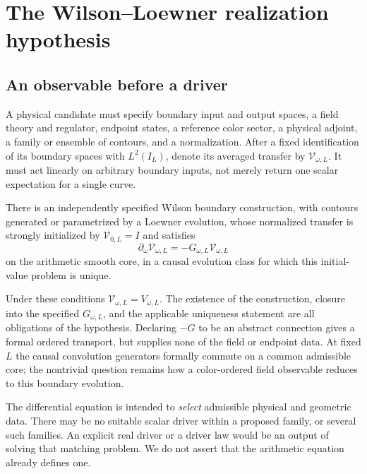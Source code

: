 \section{The Wilson--Loewner realization hypothesis}\label{sec:realization}

\subsection{An observable before a driver}

A physical candidate must specify boundary input and output spaces,
a field theory and regulator, endpoint states, a reference color
sector, a physical adjoint, a family or ensemble of contours, and a
normalization. After a fixed identification of its boundary spaces
with $L^2(I_L)$, denote its averaged transfer by
$\mathcal V_{\omega,L}$. It must act linearly on arbitrary boundary
inputs, not merely return one scalar expectation for a single curve.

\begin{hypothesis}\label{hyp:realization}
There is an independently specified Wilson boundary construction,
with contours generated or parametrized by a Loewner evolution,
whose normalized transfer is strongly initialized by
$\mathcal V_{0,L}=I$ and satisfies
\begin{equation}\label{eq:physical-flow}
 \partial_\omega\mathcal V_{\omega,L}
       =-G_{\omega,L}\mathcal V_{\omega,L}
\end{equation}
on the arithmetic smooth core, in a causal evolution class for
which this initial-value problem is unique.
\end{hypothesis}

Under these conditions $\mathcal V_{\omega,L}=V_{\omega,L}$.
The existence of the construction, closure into the specified
$G_{\omega,L}$, and the applicable uniqueness statement are all
obligations of the hypothesis. Declaring $-G$ to be an abstract
connection gives a formal ordered transport, but supplies none of
the field or endpoint data. At fixed $L$ the causal convolution
generators formally commute on a common admissible core; the nontrivial question remains how
a color-ordered field observable reduces to this boundary evolution.

The differential equation is intended to \emph{select} admissible
physical and geometric data. There may be no suitable scalar
driver within a proposed family, or several such families. An
explicit real driver or a driver law would be an output of solving
that matching problem. We do not assert that the arithmetic
equation already defines one.

